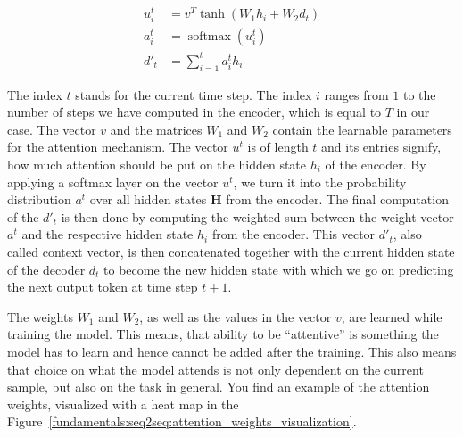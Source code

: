 \begin{equation}
\label{fundamentals:attention:equations}
\begin{split}
	u^t_i & = v^T \tanh(W_1 h_i + W_2 d_t) \\
	a^t_i & = \operatorname{softmax}(u^t_i) \\
	d'_t & = \sum_{i=1}^{t} a^t_i h_i
\end{split}
\end{equation}

The index $t$ stands for the current time step. The index $i$ ranges from $1$ to the number of steps we have computed in the encoder, which is equal to $T$ in our case. The vector $v$ and the matrices $W_1$ and $W_2$ contain the learnable parameters for the attention mechanism. The vector $u^t$ is of length $t$ and its entries signify, how much attention should be put on the hidden state $h_i$ of the encoder. By applying a softmax layer on the vector $u^t$, we turn it into the probability distribution $a^t$ over all hidden states $\mathbf{H}$ from the encoder. The final computation of the $d'_t$ is then done by computing the weighted sum between the weight vector $a^t$ and the respective hidden state $h_i$ from the encoder. This vector $d'_t$, also called context vector, is then concatenated together with the current hidden state of the decoder $d_t$ to become the new hidden state with which we go on predicting the next output token at time step $t+1$.

The weights $W_1$ and $W_2$, as well as the values in the vector $v$, are learned while training the model. This means, that ability to be ``attentive'' is something the model has to learn and hence cannot be added after the training. This also means that choice on what the model attends is not only dependent on the current sample, but also on the task in general. You find an example of the attention weights, visualized with a heat map in the Figure~\ref{fundamentals:seq2seq:attention_weights_visualization}.


